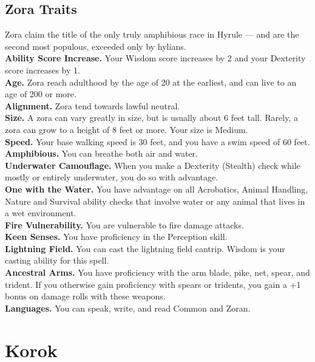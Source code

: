 \documentclass[10pt,twoside,twocolumn,openany]{book}
\begin{document}
\subsection{Zora Traits}
Zora claim the title of the only truly amphibious race in Hyrule — and are the second most populous, exceeded only by hylians.\\
\indent \textbf{Ability Score Increase.} Your Wisdom score increases by 2 and your Dexterity score increases by 1.\\
\indent \textbf{Age.} Zora reach adulthood by the age of 20 at the earliest, and can live to an age of 200 or more.\\
\indent \textbf{Alignment.} Zora tend towards lawful neutral.\\
\indent \textbf{Size.} A zora can vary greatly in size, but is usually about 6 feet tall. Rarely, a zora can grow to a height of 8 feet or more. Your size is Medium.\\
\indent \textbf{Speed.} Your base walking speed is 30 feet, and you have a swim speed of 60 feet.\\
\indent \textbf{Amphibious.} You can breathe both air and water.\\
\indent \textbf{Underwater Camouflage.} When you make a Dexterity (Stealth) check while mostly or entirely underwater, you do so with advantage. \\
\indent \textbf{One with the Water.} You have advantage on all Acrobatics, Animal Handling, Nature and Survival ability checks that involve water or any animal that lives in a wet environment.\\
\indent \textbf{Fire Vulnerability.} You are vulnerable to fire damage attacks.\\
\indent \textbf{Keen Senses.} You have proficiency in the Perception skill.\\
\indent \textbf{Lightning Field.} You can cast the lightning field cantrip. Wisdom is your casting ability for this spell. \\
\indent \textbf{Ancestral Arms.} You have proficiency with the arm blade, pike, net, spear, and trident. If you otherwise gain proficiency with spears or tridents, you gain a +1 bonus on damage rolls with these weapons.\\
\indent \textbf{Languages.} You can speak, write, and read Common and Zoran.
\newpage

\section{Korok}
\end{document}
